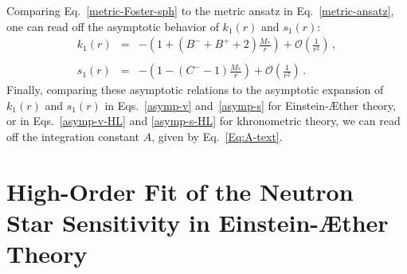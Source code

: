 \documentclass[prd,aps,twocolumn,nofootinbib,showpacs,superscriptaddress]{revtex4-1}
\newcommand\ba{\begin{eqnarray}}
\newcommand\ea{\end{eqnarray}}
\newcommand{\nn}{\nonumber}
\begin{document}
Comparing Eq.~\eqref{metric-Foster-sph} to the metric ansatz in
Eq.~\eqref{metric-ansatz}, one can read off the asymptotic behavior of
$k_1(r)$ and $s_1(r)$:
%
\ba
\label{asymp-v2}
k_1(r) &=& - \left( 1+ (B^{-} + B^{+}+2) \frac{M_*}{r} \right) +
\mathcal{O}\left( \frac{1}{r^2} \right)\,, \nn \\ \\
\label{asymp-s2}
s_1(r) &=& -\left( 1- (C^{-}-1) \frac{M_*}{r} \right) +
\mathcal{O}\left( \frac{1}{r^2} \right)\,.
\ea
%
Finally, comparing these asymptotic relations to the asymptotic
expansion of $k_1(r)$ and $s_1(r)$ in Eqs.~\eqref{asymp-v}
and~\eqref{asymp-s} for Einstein-\AE ther theory, or in Eqs.~\eqref{asymp-v-HL} and \eqref{asymp-s-HL} for khronometric theory, 
we can read off the integration constant $A$, given by Eq.~\eqref{Eq:A-text}.

\section{High-Order Fit of the Neutron Star Sensitivity in Einstein-\AE ther Theory }
\label{app:fit}
\end{document}
